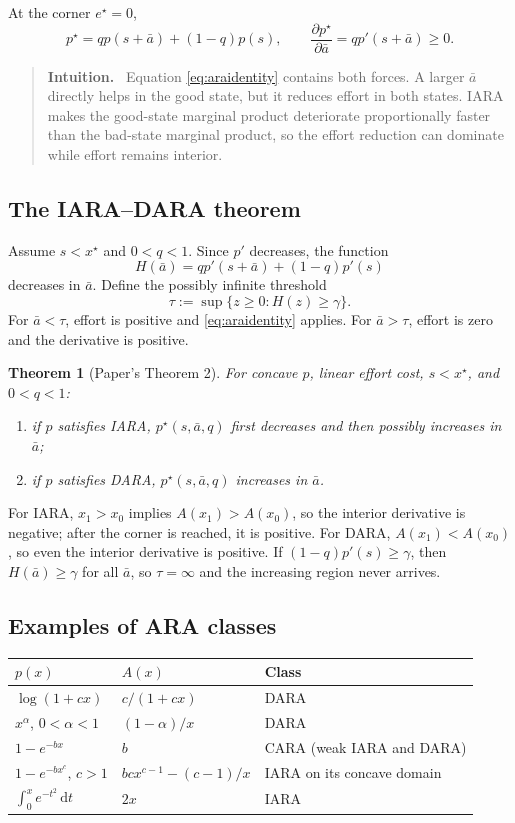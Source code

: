 \documentclass[11pt]{article}
\theoremstyle{tutorial}
\newtheorem{theorem}{Theorem}[section]
\theoremstyle{remark}
\newenvironment{intuition}{\begin{quote}\color{teal}\textbf{Intuition.}\ }{\end{quote}}
\newcommand{\1}{\mathbb{I}}
\newcommand{\dd}{\,\mathrm{d}}
\begin{document}
At the corner $e^\star=0$,
\[
p^\star=q p(s+\bar a)+(1-q)p(s),
\qquad
\frac{\partial p^\star}{\partial\bar a}=q p'(s+\bar a)\ge0.
\]

\begin{intuition}
Equation \eqref{eq:araidentity} contains both forces.  A larger $\bar a$ directly helps in the good state,
but it reduces effort in both states.  IARA makes the good-state marginal product deteriorate proportionally
faster than the bad-state marginal product, so the effort reduction can dominate while effort remains
interior.
\end{intuition}

\subsection{The IARA--DARA theorem}

Assume $s<x^\star$ and $0<q<1$.  Since $p'$ decreases, the function
\[
H(\bar a)=q p'(s+\bar a)+(1-q)p'(s)
\]
decreases in $\bar a$.  Define the possibly infinite threshold
\[
\tau:=\sup\{z\ge0:H(z)\ge\gamma\}.
\]
For $\bar a<\tau$, effort is positive and \eqref{eq:araidentity} applies.  For $\bar a>\tau$, effort is zero
and the derivative is positive.

\begin{theorem}[Paper's Theorem 2]
For concave $p$, linear effort cost, $s<x^\star$, and $0<q<1$:
\begin{enumerate}
  \item if $p$ satisfies IARA, $p^\star(s,\bar a,q)$ first decreases and then possibly increases in $\bar a$;
  \item if $p$ satisfies DARA, $p^\star(s,\bar a,q)$ increases in $\bar a$.
\end{enumerate}
\end{theorem}

For IARA, $x_1>x_0$ implies $A(x_1)>A(x_0)$, so the interior derivative is negative; after the corner is
reached, it is positive.  For DARA, $A(x_1)<A(x_0)$, so even the interior derivative is positive.
If $(1-q)p'(s)\ge\gamma$, then $H(\bar a)\ge\gamma$ for all $\bar a$, so $\tau=\infty$ and the increasing
region never arrives.

\subsection{Examples of ARA classes}

\begin{center}
\begin{tabular}{lll}
\toprule
$p(x)$ & $A(x)$ & Class\\
\midrule
$\log(1+cx)$ & $c/(1+cx)$ & DARA\\
$x^\alpha$, $0<\alpha<1$ & $(1-\alpha)/x$ & DARA\\
$1-e^{-bx}$ & $b$ & CARA (weak IARA and DARA)\\
$1-e^{-b x^c}$, $c>1$ & $bcx^{c-1}-(c-1)/x$ & IARA on its concave domain\\
$\int_0^x e^{-t^2}\dd t$ & $2x$ & IARA\\
\bottomrule
\end{tabular}
\end{center}
\end{document}
